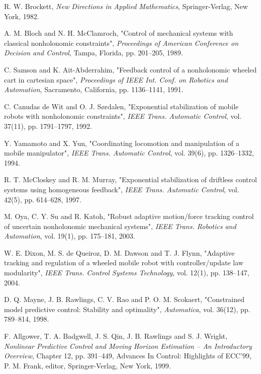 \documentclass[twocolumn]{IEEEtran} %
\begin{document}
\begin{thebibliography}{}

R. W. Brockett, 
{\em New Directions in Applied Mathematics},
Springer-Verlag, New York, 1982.

A. M. Bloch and N. H. McClamroch,
"Control of mechanical systems with classical nonholonomic constraints",
{\em Proceedings of American Conference on Decision and Control\/}, Tampa, Florida, pp. 201--205, 1989.

C. Samson and K. Ait-Abderrahim,
"Feedback control of a nonholonomic wheeled cart in cartesian space",
{\em Proceedings of IEEE Int. Conf. on Robotics and Automation\/}, Sacramento, California, pp. 1136--1141, 1991.

C. Canudas de Wit and O. J. S\o rdalen, 
"Exponential stabilization of mobile robots with nonholonomic constraints",
{\em IEEE Trans. Automatic Control\/}, vol. 37(11), pp. 1791--1797, 1992.

Y. Yamamoto and X. Yun, 
"Coordinating locomotion and manipulation of a mobile manipulator",
{\em IEEE Trans. Automatic Control\/}, vol. 39(6), pp. 1326--1332, 1994.

R. T. McCloskey and R. M. Murray, 
"Exponential stabilization of driftless control systems using homogeneous feedback",
{\em IEEE Trans. Automatic Control\/}, vol. 42(5), pp. 614--628, 1997.

M. Oya, C. Y. Su and R. Katoh, 
"Robust adaptive motion/force tracking control of uncertain nonholonomic mechanical systems",
{\em IEEE Trans. Robotics and Automation\/}, vol. 19(1), pp. 175--181, 2003.

W. E. Dixon, M. S. de Queiroz, D. M. Dawson and T. J. Flynn, 
"Adaptive tracking and regulation of a wheeled mobile robot with controller/update law modularity",
{\em IEEE Trans. Control Systems Technology\/}, vol. 12(1), pp. 138--147, 2004.

D. Q. Mayne, J. B. Rawlings, C. V. Rao and P. O. M. Scokaert, 
"Constrained model predictive control: Stability and optimality",
{\em Automatica\/}, vol. 36(12), pp. 789--814, 1998.

F. Allgower, T. A. Badgwell, J. S. Qin, J. B. Rawlings and S. J. Wright, 
{\em Nonlinear Predictive Control and Moving Horizon Estimation -- An Introductory Overview},
Chapter 12, pp. 391--449, Advances In Control: Highlights of ECC'99,
P. M. Frank, editor, Springer-Verlag, New York, 1999.


\end{thebibliography}
\end{document}
